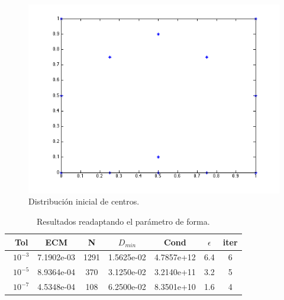 \documentclass[11pt,a4paper]{article}
\begin{document}
\begin{figure}[H]
\begin{center}
\includegraphics[scale=.5]{inicial1.png}
\caption{Distribución inicial de centros.}
\end{center}
\end{figure}
\begin{table}[H]
\caption{Resultados readaptando el parámetro de forma.}
\begin{center}
\begin{tabular}{|c|c|c|c|c|c|c|}
\hline
\ Tol & ECM & N & $D_{min}$ & Cond & $\epsilon$ & iter \\
\hline
\ $10^{-3}$ & 7.1902e-03 & 1291 & 1.5625e-02 & 4.7857e+12 & 6.4 & 6\\
\ $10^{-5}$ & 8.9364e-04 & 370 & 3.1250e-02& 3.2140e+11 & 3.2 & 5 \\
\ $10^{-7}$& 4.5348e-04 & 108 & 6.2500e-02 & 8.3501e+10 & 1.6 & 4 \\
\hline
\end{tabular}
\end{center}
\end{table}
\end{document}
